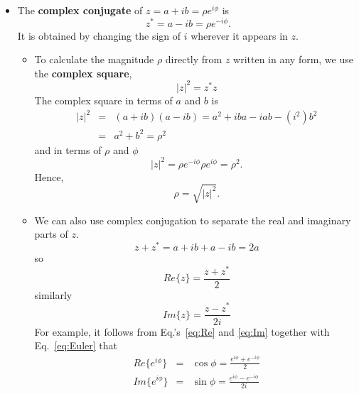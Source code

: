 \documentclass[12pt]{article}
\begin{document}
\begin{itemize}
\item The \textbf{complex conjugate} of $z = a + ib = \rho e^{i\phi}$
  is 
  \[
  z^* = a - ib = \rho e^{-i \phi}.
  \]
  It is obtained by changing the sign of $i$ wherever it appears in $z$.
  \begin{itemize}
  \item To calculate the magnitude $\rho$ directly from $z$ written in
    any form, we use the \textbf{complex square}, 
    \[
    |z|^2 = z^* z
    \]
    The complex square in terms of $a$ and $b$ is
    \begin{eqnarray}
      \nonumber
      |z|^2 &=& (a + ib)(a - ib) = a^2 + iba - iab - (i^2)b^2 \\
      &=& a^2 + b^2 = \rho^2
    \end{eqnarray}
    and in terms of $\rho$ and $\phi$
    \[
    |z|^2 = \rho e^{-i \phi} \rho e^{i \phi} = \rho^2.
    \]
    Hence,
    \begin{equation}
      \rho = \sqrt{|z|^2}.
    \end{equation}

  \item We can also use complex conjugation to separate the real and
    imaginary parts of $z$.
    \[
    z + z^* = a + ib + a - ib = 2a
    \]
    so
    \begin{equation}
    \label{eq:Re}
    Re\{z\} = \frac{z + z^*}{2}
    \end{equation}
    similarly
    \begin{equation}
      \label{eq:Im}
      Im\{z\} = \frac{z - z^*}{2i}
    \end{equation}
    For example, it follows from Eq.'s~\ref{eq:Re} and \ref{eq:Im} together
    with Eq.~\ref{eq:Euler} that
    \begin{eqnarray}
      \nonumber
      Re\{e^{i\phi}\} & = & \cos \phi = \frac{e^{i\phi} + e^{-i\phi}}{2}\\
      Im\{e^{i\phi}\} & = & \sin \phi = \frac{e^{i\phi} - e^{-i\phi}}{2i}
    \end{eqnarray}
  \end{itemize}

\end{itemize}
\end{document}
